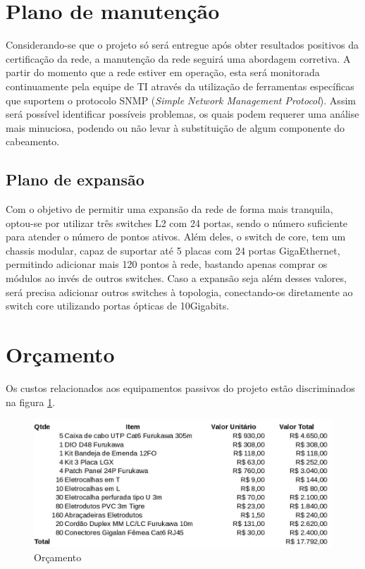 \documentclass[	DIV=calc,%
							paper=a4,%
							fontsize=12pt,%
							onecolumn]{scrartcl}	 					%
\begin{document}
\section{Plano de manutenção}
Considerando-se que o projeto só será entregue após obter resultados positivos da certificação da rede, a manutenção da rede seguirá uma abordagem corretiva.
A partir do momento que a rede estiver em operação, esta será monitorada continuamente pela equipe de TI através da utilização de ferramentas específicas que suportem o protocolo SNMP (\textit{Simple Network Management Protocol}).
Assim será possível identificar possíveis problemas, os quais podem requerer uma análise mais minuciosa, podendo ou não levar à substituição de algum componente do cabeamento.


\subsection{Plano de expansão}
Com o objetivo de permitir uma expansão da rede de forma mais tranquila, optou-se por utilizar três switches L2 com 24 portas, sendo o número suficiente para atender o número de pontos ativos.
Além deles, o switch de core, tem um chassis modular, capaz de suportar até 5 placas com 24 portas GigaEthernet, permitindo adicionar mais 120 pontos à rede, bastando apenas comprar os módulos ao invés de outros switches.
Caso a expansão seja além desses valores, será precisa adicionar outros switches à topologia, conectando-os diretamente ao switch core utilizando portas ópticas de 10Gigabits.


\section{Orçamento}
Os custos relacionados aos equipamentos passivos do projeto estão discriminados na figura \ref{orcamento}.
\begin{figure}
\centering
\includegraphics[width=\textwidth]{orcamento}
\caption{Orçamento}
\label{orcamento}
\end{figure}
\end{document}
